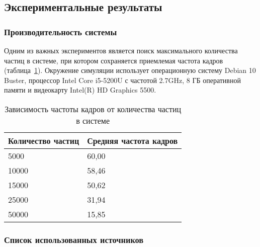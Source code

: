 \subsection{Экспериментальные результаты}
\begin{frame}
\frametitle{Производительность системы}
Одним из важных экспериментов является поиск максимального количества частиц в
системе, при котором сохраняется приемлемая частота кадров
(таблица~\ref{table:amountBench}).
Окружение симуляции использует операционную систему Debian 10 Buster, процессор
Intel Core i5-5200U с частотой 2.7GHz, 8 ГБ оперативной памяти и видеокарту
Intel(R) HD Graphics 5500.
\begin{table}[htb]
\caption{Зависимость частоты кадров от количества частиц в системе}%
\label{table:amountBench}
\centering
\small
\begin{tabular}{| l | l |}
    \hline
    Количество частиц & Средняя частота кадров \\
    \hline
    5000 &  60,00 \\
    \hline
    10000 & 58,46 \\
    \hline
    15000 & 50,62 \\
    \hline
    25000 & 31,94 \\
    \hline
    50000 & 15,85 \\
    \hline
\end{tabular}
\end{table}
\end{frame}

\begin{frame}[t,allowframebreaks]
\frametitle{Список использованных источников}
\sloppy\printbibliography[
    notcategory=AuthorSources,
    heading=none,
    resetnumbers,
]
\end{frame}

